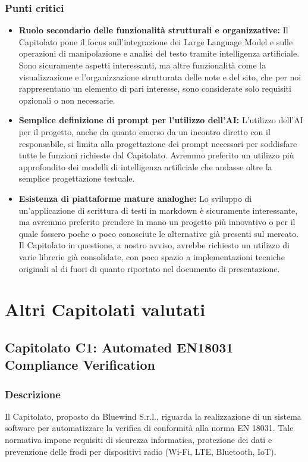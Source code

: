 \documentclass[a4paper,12pt]{article}
\begin{document}
\subsubsection{Punti critici}
\begin{itemize}
    \item \textbf{Ruolo secondario delle funzionalità strutturali e organizzative:} Il Capitolato pone il focus sull’integrazione dei Large Language Model e sulle operazioni di manipolazione e analisi del testo tramite intelligenza artificiale. Sono sicuramente aspetti interessanti, ma altre funzionalità come la visualizzazione e l’organizzazione strutturata delle note e del sito, che per noi rappresentano un elemento di pari interesse, sono considerate solo requisiti opzionali o non necessarie.
    \item \textbf{Semplice definizione di prompt per l’utilizzo dell’AI:} L’utilizzo dell’AI per il progetto, anche da quanto emerso da un incontro diretto con il responsabile, si limita alla progettazione dei prompt necessari per soddisfare tutte le funzioni richieste dal Capitolato. Avremmo preferito un utilizzo più approfondito dei modelli di intelligenza artificiale che andasse oltre la semplice progettazione testuale.
    \item \textbf{Esistenza di piattaforme mature analoghe:} Lo sviluppo di un’applicazione di scrittura di testi in markdown è sicuramente interessante, ma avremmo preferito prendere in mano un progetto più innovativo o per il quale fossero poche o poco conosciute le alternative già presenti sul mercato. Il Capitolato in questione, a nostro avviso, avrebbe richiesto un utilizzo di varie librerie già consolidate, con poco spazio a implementazioni tecniche originali al di fuori di quanto riportato nel documento di presentazione.
\end{itemize}


\section{Altri Capitolati valutati}
\subsection{Capitolato C1: Automated EN18031 Compliance Verification}

\subsubsection{Descrizione}
Il Capitolato, proposto da Bluewind S.r.l., riguarda la realizzazione di un sistema software per automatizzare la verifica di conformità alla norma EN 18031. Tale normativa impone requisiti di sicurezza informatica, protezione dei dati e prevenzione delle frodi per dispositivi radio (Wi-Fi, LTE, Bluetooth, IoT).
\end{document}
